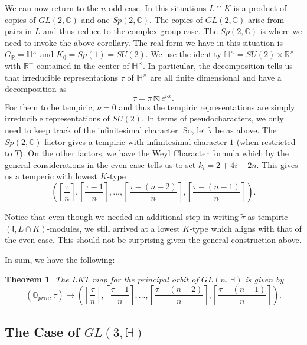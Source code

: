 \documentclass[letterpaper,twosided,11pt]{article}
\theoremstyle{plain}
\newtheorem{theorem}{Theorem}[section]
\theoremstyle{definition}
\theoremstyle{remark}
\newcommand{\C}{\mathbb{C}}
\newcommand{\HH}{\mathbb{H}}
\newcommand{\R}{\mathbb{R}}
\newcommand{\lie}[1]{\mathfrak{#1}}
\begin{document}
We can now return to the $ n $ odd case.  In this situations $ L\cap K $
is a product of copies of $ GL(2,\C) $ and one $ Sp(2,\C). $ The copies
of $ GL(2,\C) $ arise from pairs in $ L $ and thus reduce to the complex
group case.  The $ Sp(2,\C) $ is where we need to invoke the above
corollary.  The real form we have in this situation is $ G_\R=\HH^\times
$ and $ K_0=Sp(1)=SU(2). $ We use the identity $ \HH^\times=SU(2)\times
\R^\times $ with $ \R^+ $ contained in the center of $ \HH^\times $.  In
particular, the decomposition tells us that irreducible representations $
\tau $ of $ \HH^\times $ are all finite dimensional and have a
decomposition as
\[
    \tau=\pi \boxtimes e^{ \nu x}.
\]
For them to be tempiric, $ \nu=0 $ and thus the tempiric representations
are simply irreducible representations of $ SU(2). $ In terms of
pseudocharacters, we only need to keep track of the infinitesimal
character.  So, let $ \tilde{\tau} $ be as above.  The $ Sp(2,\C) $
factor gives a tempiric with infinitesimal character $ 1 $ (when
restricted to $ T $).  On the other factors, we have the Weyl Character
formula which by the general considerations in the even case tells us to
set $ k_i=2+4i-2n. $ This gives us a temperic with lowest $ K $-type
\[
    \left( \left\lceil \frac{\tau}{n} \right \rceil, \left\lceil \frac{\tau-1}
    {n} \right \rceil ,...,\left\lceil \frac{\tau-(n-2)}{n} \right
    \rceil ,\left\lceil \frac{\tau-(n-1)}{n} \right \rceil \right).
\]

Notice that even though we needed an additional step in writing $ \tilde
{\tau} $ as tempiric $ (\lie{l},L\cap K) $-modules, we still arrived at
a lowest $ K $-type which aligns with that of the even case.  This
should not be surprising given the general construction above.

In sum, we have the following: 

\begin{theorem} 
	The $LKT$ map for the principal orbit of $GL(n,\HH)$ is given by \[ (\mathbb{O}_{prin},\tau)\mapsto \left( \left\lceil \frac{\tau}{n} \right \rceil, \left\lceil \frac{\tau-1}
    {n} \right \rceil ,...,\left\lceil \frac{\tau-(n-2)}{n} \right
    \rceil ,\left\lceil \frac{\tau-(n-1)}{n} \right \rceil \right).\]
\end{theorem} 


\subsection{The Case of $ GL(3,\HH) $}
\end{document}
